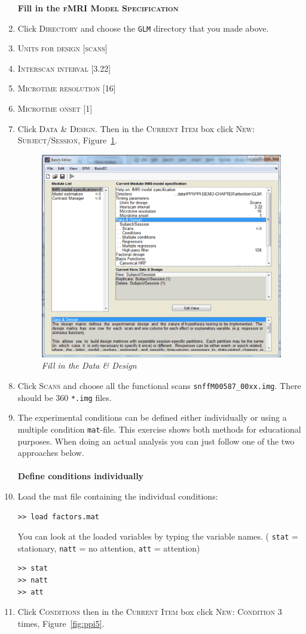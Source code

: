 \begin{enumerate}
\textbf{Fill in the \textsc{fMRI Model Specification}}

\item Click \textsc{Directory} and choose the \texttt{GLM} directory that you made above.
\item \textsc{Units for design} [\textsc{scans}]
\item \textsc{Interscan interval} [3.22]
\item \textsc{Microtime resolution} [16]
\item \textsc{Microtime onset} [1]
\item Click \textsc{Data \& Design}. Then in the \textsc{Current Item} box click \textsc{New: Subject/Session}, Figure~\ref{fig:ppi4}.

\begin{figure}[!ht]
\centering\includegraphics[width=120mm]{ppi/figures/Fig4.png}
\caption{\em Fill in the Data \& Design}
\label{fig:ppi4}
\end{figure}

\item Click \textsc{Scans} and choose all the functional scans \texttt{snffM00587\_00xx.img}. There should be 360 \texttt{*.img} files.
\item The experimental conditions can be defined either individually or using a multiple condition \texttt{mat}-file. This exercise shows both methods for educational purposes. When doing an actual analysis you can just follow one of the two approaches below.\\\\

\textbf{Define conditions individually}
\item Load the mat file containing the individual conditions:
\begin{verbatim}
>> load factors.mat
\end{verbatim}
You can look at the loaded variables by typing the variable names.
( \texttt{stat} = stationary, \texttt{natt} = no attention, \texttt{att} = attention)
\begin{verbatim}
>> stat
>> natt
>> att
\end{verbatim}
\item Click \textsc{Conditions} then in the \textsc{Current Item} box click \textsc{New: Condition} 3 times, Figure~\ref{fig:ppi5}.


\end{enumerate}
